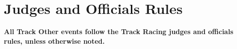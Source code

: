 \chapter{Judges and Officials Rules}

\textbf{All Track Other events follow the Track Racing judges and officials rules, unless otherwise noted.}
